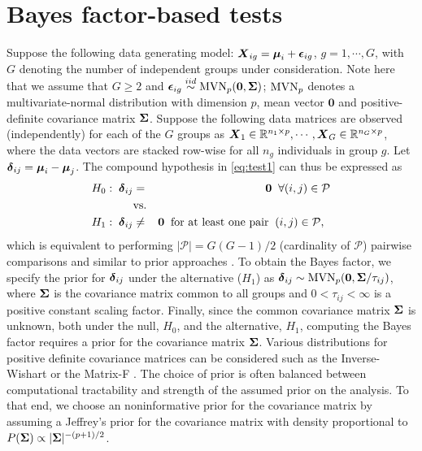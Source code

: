 \documentclass[times,sort&compress,3p]{elsarticle}
\theoremstyle{plain}%
\theoremstyle{definition}
\def\bzero{{\mathbf 0}}
\newcommand{\uzero}            {\mbox{\boldmath$0$}}
\def\MVN{\hbox{MVN}}
\def\be{\begin{eqnarray}}
\def\ee{\end{eqnarray}}
\def\bzero{{\mathbf 0}}
\newcommand{\uS}       {\mbox{\boldmath$S$}}
\newcommand{\uX}       {\mbox{\boldmath$X$}}
\newcommand{\udelta}            {\mbox{\boldmath$\delta$}}
\newcommand{\uepsilon}          {\mbox{\boldmath$\epsilon$}}
\newcommand{\umu}               {\mbox{\boldmath$\mu$}}
\newcommand{\uSigma}            {\mbox{\boldmath$\Sigma$}}
\begin{document}
\section{Bayes factor-based tests} \label{sec:test}
Suppose the following data generating model: $\uX_{ig} = \umu_i + \uepsilon_{ig}$, $g = 1, \cdots, G$, with $G$ denoting the number of independent groups under consideration.
Note here that we assume that $G \geq 2$ and $\uepsilon_{ig} \stackrel{iid}{\sim} \MVN_{p}(\bzero, \uSigma)$; $\MVN_{p}$ denotes a multivariate-normal distribution with dimension $p$, mean vector $\bzero$ and positive-definite covariance matrix $\uSigma$. Suppose the following data matrices are observed (independently) for each of the $G$ groups as $\uX_1 \in \mathbb{R}^{n_1 \times p}, \cdots,  \uX_G \in \mathbb{R}^{n_G \times p}$, where the data vectors are stacked row-wise for all $n_g$ individuals in group $g$. 
Let $\udelta_{ij} = \umu_i - \umu_j$. The compound hypothesis in \eqref{eq:test1} can thus be expressed as
\be
H_0:\; \udelta_{ij} &=& \uzero\;\;\forall (i,j) \in \mathcal{P} \nonumber \\
 &\mbox{vs.}& \nonumber \\
 H_1: \; \udelta_{ij}  &\neq & \uzero\;\;\mbox{for at least one pair}\;\;(i,j) \in \mathcal{P},\;\; \label{eq:hyp1} 
\ee
which is equivalent to performing $|\mathcal{P}| = G(G-1)/2$ (cardinality of $\mathcal{P}$) pairwise comparisons and similar to prior approaches \cite{ahmad2014u,tony2014two}. To obtain the Bayes factor, we specify the prior for $\udelta_{ij}$ under the alternative ($H_1$) as $\udelta_{ij} \sim \MVN_{p}(\uzero, \uSigma/\tau_{ij})$, where $\uSigma$ is the covariance matrix common to all groups and $ 0 < \tau_{ij} < \infty$ is a positive constant scaling factor. Finally, since the common covariance matrix $\uSigma$ is unknown, both under the null, $H_0$, and the alternative, $H_1$, computing the Bayes factor requires a prior for the covariance matrix $\uSigma$. Various distributions for positive definite covariance matrices can be considered such as the Inverse-Wishart or the Matrix-F \cite{mulder2018matrix}. The choice of prior is often balanced between computational tractability and strength of the assumed prior on the analysis. To that end, we choose an noninformative prior for the covariance matrix by assuming a Jeffrey's prior for the covariance matrix with density proportional to $P(\uSigma) \propto |\uSigma|^{-(p+1)/2}$. 
\end{document}
